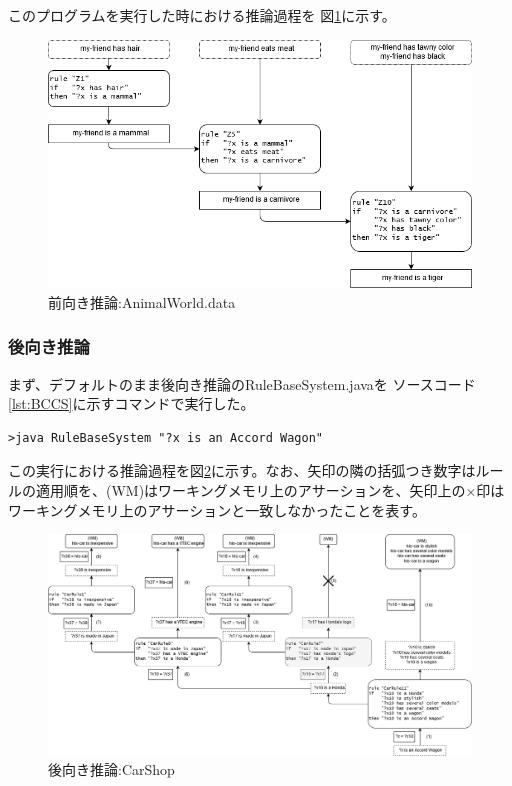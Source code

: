 \documentclass{jarticle}
\begin{document}
このプログラムを実行した時における推論過程を
図\ref{fig:FCAW}に示す。
 
\begin{figure}[htbp]
\includegraphics[scale=0.35]{048/Forward2.png}
\caption{前向き推論:AnimalWorld.data}
\label{fig:FCAW}
\end{figure}


\subsubsection{後向き推論}

まず、デフォルトのまま後向き推論のRuleBaseSystem.javaを
ソースコード\ref{lst:BCCS}に示すコマンドで実行した。

\begin{lstlisting}[caption=後ろ向き推論1,label=lst:BCCS]
>java RuleBaseSystem "?x is an Accord Wagon"
\end{lstlisting}

この実行における推論過程を図\ref{fig:BCCS}に示す。なお、矢印の隣の括弧つき数字はルールの適用順を、(WM)はワーキングメモリ上のアサーションを、矢印上の×印はワーキングメモリ上のアサーションと一致しなかったことを表す。

\begin{figure}[htbp]
\includegraphics[scale=0.25]{048/Backward1.png}
\caption{後向き推論:CarShop}
\label{fig:BCCS}
\end{figure}
\end{document}
